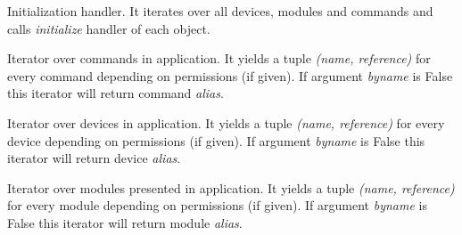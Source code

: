 \documentclass[letterpaper,10pt,english]{sphinxmanual}
\begin{document}
\begin{fulllineitems}
\begin{fulllineitems}
\end{fulllineitems}


\begin{fulllineitems}
\label{sysmod:pyfrid.modules.system.app.BaseApplicationModule.initialize}
Initialization handler. It iterates over all devices, modules and commands and calls \emph{initialize} handler of each object.

\end{fulllineitems}


\begin{fulllineitems}
\label{sysmod:pyfrid.modules.system.app.BaseApplicationModule.iterate_commands}
Iterator over commands in application. It yields a tuple \emph{(name, reference)} for every command
depending on permissions (if given). If argument \emph{byname} is False this iterator will return command \emph{alias}.

\end{fulllineitems}


\begin{fulllineitems}
\label{sysmod:pyfrid.modules.system.app.BaseApplicationModule.iterate_devices}
Iterator over devices in application. It yields a tuple \emph{(name, reference)} for every device
depending on permissions (if given). If argument \emph{byname} is False this iterator will return device \emph{alias}.

\end{fulllineitems}


\begin{fulllineitems}
\label{sysmod:pyfrid.modules.system.app.BaseApplicationModule.iterate_modules}
Iterator over modules presented in application. It yields a tuple \emph{(name, reference)} for every module
depending on permissions (if given). If argument \emph{byname} is False this iterator will return module \emph{alias}.


\end{fulllineitems}
\end{fulllineitems}
\end{document}

